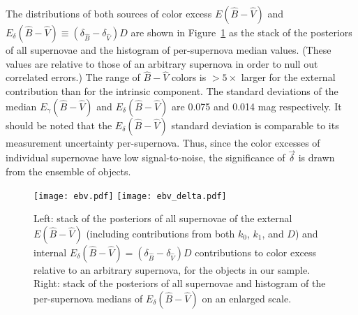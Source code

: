 \documentclass{aastex61}   	%
\begin{document}
The distributions of both sources of color excess $E({\hat{B}}-{\hat{V}})$ and
 $E_\delta({\hat{B}}-{\hat{V}}) \equiv   (\delta_{\hat{B}}-\delta_{\hat{V}})D$ are shown in Figure~\ref{ebv:fig} as the  \color{red} stack of the posteriors of all supernovae 
 and the histogram of per-supernova median values. \color{black} 
 (These values are relative
to
 those of an arbitrary supernova in order to null out correlated errors.)
The range of ${\hat{B}}-{\hat{V}}$ colors is $> 5 \times$ larger for the external contribution than for the
intrinsic
component.  
The standard deviations of  the median $E_\gamma({\hat{B}}-{\hat{V}})$ and $E_\delta({\hat{B}}-{\hat{V}})$ are
0.075
and 0.014
mag respectively.
It should be noted that
the $E_\delta({\hat{B}}-{\hat{V}})$ standard deviation is comparable to its measurement uncertainty per-supernova.
Thus, since
the color excesses of individual supernovae have low signal-to-noise,
the significance of $\vec{\delta}$
is drawn from the ensemble of objects.

\begin{figure}[htbp] %
   \centering
   \texttt{[image: ebv.pdf]}
   \texttt{[image: ebv\_delta.pdf]}
      \caption{Left:  \color{red} stack of the posteriors of all supernovae \color{black}  of the external $E({\hat{B}}-{\hat{V}})$ 
      (including contributions from both $k_0$, $k_1$, and $D$)
      and
   internal $E_\delta({\hat{B}}-{\hat{V}}) = (\delta_{\hat{B}}-\delta_{\hat{V}})D$  contributions to color excess relative to an arbitrary supernova, for the objects in our sample.
   Right:  \color{red} stack of the posteriors of all supernovae \color{black}  and histogram of the \color{red} per-supernova \color{black}
   medians of $E_\delta({\hat{B}}-{\hat{V}})$ on an enlarged scale.
   \label{ebv:fig}}
\end{figure}
\end{document}
